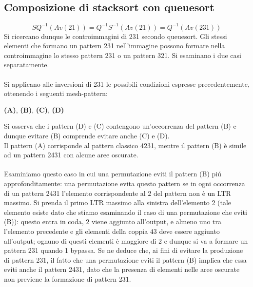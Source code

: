 \subsection{Composizione di {stacksort} con {queuesort}}
$$SQ^{-1}(Av(21)) = Q^{-1}S^{-1}(Av(21)) = Q^{-1}(Av(231))$$
Si ricercano dunque le controimmagini di 231 secondo queuesort. Gli stessi elementi che formano un pattern 231 nell'immagine possono formare nella controimmagine lo stesso pattern 231 o un pattern 321. Si esaminano i due casi separatamente.\\\\
Si applicano alle inversioni di 231 le possibili condizioni espresse precedentemente, ottenendo i seguenti mesh-pattern:
\begin{center}
\textbf{(A)},
\textbf{(B)},
\textbf{(C)},
\textbf{(D)}
\end{center}
Si osserva che i pattern (D) e (C) contengono un'occorrenza del pattern (B) e dunque evitare (B) comprende evitare anche (C) e (D).\\
Il pattern (A) corrisponde al pattern classico 4231, mentre il pattern (B) \`e simile ad un pattern 2431 con alcune aree oscurate.\\\\
Esaminiamo questo caso in cui una permutazione eviti il pattern (B) pi\'u approfonditamente: una permutazione evita questo pattern se in ogni occorrenza di un pattern 2431 l'elemento corrispondente al 2 del pattern non \`e un LTR massimo. Si prenda il primo LTR massimo alla sinistra dell'elemento 2 (tale elemento esiste dato che stiamo esaminando il caso  di una permutazione che eviti (B)): questo entra in coda, 2 viene aggiunto all'output, e almeno uno tra l'elemento precedente e gli elementi della coppia $43$ deve essere aggiunto all'output; ognuno di questi elementi \`e maggiore di 2 e dunque si va a formare un pattern 231 quando 1 bypassa. Se ne deduce che, ai fini di evitare la produzione di pattern 231, il fatto che una permutazione eviti il pattern (B) implica che essa eviti anche il pattern 2431, dato che la presenza di elementi nelle aree oscurate non previene la formazione di pattern 231.\\\\
